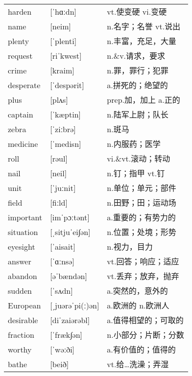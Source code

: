 \documentclass[a4paper]{article}
\begin{document}
\section{}
\begin{tabular}{l l l}

harden & [ˈhɑːdn] & vt.使变硬 vi.变硬 \\
name & [neim] & n.名字；名誉 vt.说出 \\
plenty & [ˈplenti] & n.丰富，充足，大量 \\
request & [riˈkwest] & n.\&v.请求，要求 \\
crime & [kraim] & n.罪，罪行；犯罪 \\
desperate & [ˈdespərit] & a.拼死的；绝望的 \\
plus & [plʌs] & prep.加，加上 a.正的 \\
captain & [ˈkæptin] & n.陆军上尉；队长 \\
zebra & [ˈziːbrə] & n.斑马 \\
medicine & [ˈmedisn] & n.内服药；医学 \\
roll & [rəul] & vi.\&vt.滚动；转动 \\
nail & [neil] & n.钉；指甲 vt.钉 \\
unit & [ˈjuːnit] & n.单位；单元；部件 \\
field & [fiːld] & n.田野；田；运动场 \\
important & [imˈpɔːtənt] & a.重要的；有势力的 \\
situation & [ˌsitjuˈei∫ən] & n.位置；处境；形势 \\
eyesight & [ˈaisait] & n.视力，目力 \\
answer & [ˈɑːnsə] & vt.回答；响应；适应 \\
abandon & [əˈbændən] & vt.丢弃；放弃，抛弃 \\
sudden & [ˈsʌdn] & a.突然的，意外的 \\
European & [ˌjuərəˈpi(ː)ən] & a.欧洲的 n.欧洲人 \\
desirable & [diˈzaiərəbl] & a.值得相望的；可取的 \\
fraction & [ˈfræk∫ən] & n.小部分；片断；分数 \\
worthy & [ˈwəːði] & a.有价值的；值得的 \\
bathe & [beið] & vt.给…洗澡；弄湿 \\

\end{tabular}
\end{document}
